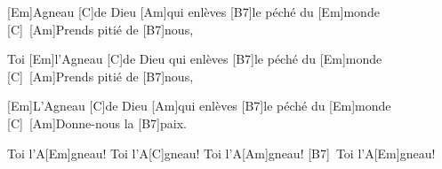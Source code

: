 \IncludeLilypondShift

\vfil
\eject

[Em]Agneau [C]de Dieu [Am]qui enlèves [B7]le péché du [Em]monde [C]\ 
[Am]Prends pitié de [B7]nous,

Toi [Em]l’Agneau [C]de Dieu qui enlèves [B7]le péché du [Em]monde [C]\ 
[Am]Prends pitié de [B7]nous,

[Em]L’Agneau [C]de Dieu [Am]qui enlèves [B7]le péché du [Em]monde [C]\ 
[Am]Donne-nous la [B7]paix.

Toi l’A[Em]gneau! Toi l’A[C]gneau! Toi l’A[Am]gneau! [B7]\ Toi l’A[Em]gneau!

